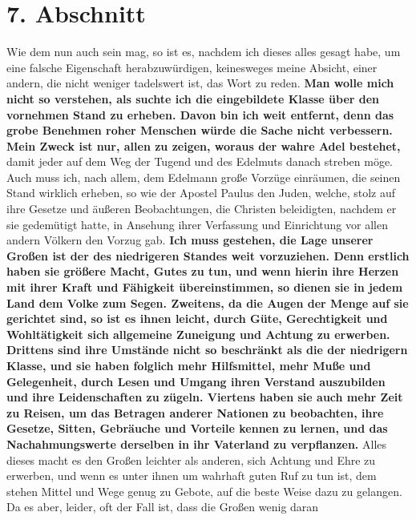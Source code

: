 \section{7. Abschnitt} \label{kap11_ab7}

Wie dem nun auch sein mag, so ist es, nachdem ich dieses alles gesagt habe, um
eine falsche Eigenschaft herabzuwürdigen, keinesweges meine Absicht, einer
andern, die nicht weniger tadelswert ist, das Wort zu reden. \textbf{Man wolle
mich
nicht so verstehen, als suchte ich die eingebildete
Klasse über den vornehmen
Stand zu erheben. Davon bin ich weit entfernt, denn das grobe
Benehmen roher
Menschen würde die Sache nicht verbessern. Mein Zweck ist nur, allen zu zeigen,
woraus der wahre Adel bestehet,} damit jeder auf dem Weg der Tugend und des
Edelmuts danach streben möge. Auch muss ich, nach allem, dem Edelmann große
Vorzüge einräumen, die seinen Stand wirklich erheben, so wie der Apostel
Paulus
den Juden, welche, stolz auf ihre Gesetze und äußeren
Beobachtungen, die Christen
beleidigten, nachdem er sie gedemütigt hatte, in Ansehung ihrer Verfassung und
Einrichtung vor allen andern Völkern den Vorzug gab.
\label{ref:11_07_standesvorteil} \textbf{Ich muss gestehen, die Lage
unserer  Großen ist der des niedrigeren
Standes weit vorzuziehen. Denn erstlich
haben sie größere Macht, Gutes zu tun, und wenn hierin ihre Herzen mit ihrer
Kraft und Fähigkeit übereinstimmen, so dienen sie in jedem Land dem Volke zum
Segen. Zweitens, da die Augen der Menge auf sie gerichtet sind, so ist es ihnen
leicht, durch Güte, Gerechtigkeit und Wohltätigkeit sich
allgemeine Zuneigung
und Achtung zu erwerben. Drittens sind ihre Umstände nicht so beschränkt als die
der niedrigern Klasse, und sie haben folglich mehr Hilfsmittel, mehr
Muße und
Gelegenheit, durch Lesen und Umgang ihren Verstand
auszubilden und ihre
Leidenschaften zu zügeln. Viertens haben sie auch mehr Zeit zu
Reisen, um das
Betragen anderer Nationen zu beobachten, ihre Gesetze, Sitten, Gebräuche und
Vorteile kennen zu lernen, und das Nachahmungswerte derselben in ihr Vaterland
zu verpflanzen.} Alles dieses macht es den Großen leichter als anderen, sich
Achtung und Ehre zu erwerben, und wenn es unter ihnen um wahrhaft guten Ruf zu
tun ist, dem stehen Mittel und Wege genug zu Gebote, auf die beste Weise dazu
zu gelangen. Da es aber, leider, oft der Fall ist, dass die Großen wenig daran
